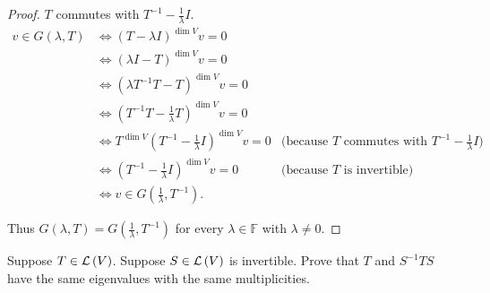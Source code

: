 \begin{proof}
    $T$ commutes with $T^{-1} - \frac{1}{\lambda}I$.
    \begin{align*}
        v\in G(\lambda, T) & \Longleftrightarrow {(T - \lambda I)}^{\dim V}v = 0                                                                                                        \\
                           & \Longleftrightarrow {(\lambda I - T)}^{\dim V}v = 0                                                                                                        \\
                           & \Longleftrightarrow {(\lambda T^{-1}T - T)}^{\dim V}v = 0                                                                                                  \\
                           & \Longleftrightarrow {\left(T^{-1}T - \frac{1}{\lambda}T\right)}^{\dim V}v = 0                                                                              \\
                           & \Longleftrightarrow T^{\dim V}{\left(T^{-1} - \frac{1}{\lambda}I\right)}^{\dim V}v = 0 & \text{(because $T$ commutes with $T^{-1} - \frac{1}{\lambda}I $)} \\
                           & \Longleftrightarrow {\left(T^{-1} - \frac{1}{\lambda}I\right)}^{\dim V}v = 0           & \text{(because $T$ is invertible)}                                \\
                           & \Longleftrightarrow v\in G\left(\frac{1}{\lambda}, T^{-1}\right).
    \end{align*}

    Thus $G(\lambda, T) = G\left(\frac{1}{\lambda}, T^{-1}\right)$ for every $\lambda\in\mathbb{F}$ with $\lambda\ne 0$.
\end{proof}
\newpage

\begin{exercise}\label{chapter8:sectionB:exercise3}
    Suppose $T\in\mathcal{L}\left({V}\right)$. Suppose $S\in\mathcal{L}\left({V}\right)$ is invertible. Prove that $T$ and $S^{-1}TS$ have the same eigenvalues with the same multiplicities.
\end{exercise}


